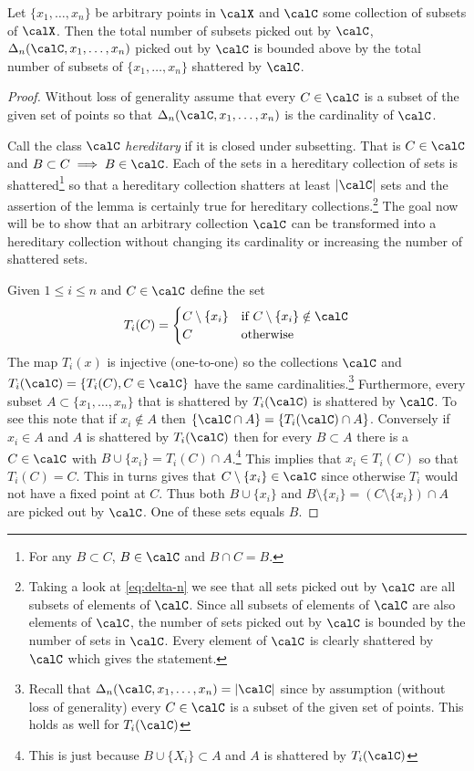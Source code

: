 \begin{lemma}
	\label{lemma:vdv2.6.2}
	Let \(\{x_1,\dots,x_n\}\) be arbitrary points in \(\calX\) and \(\calC\) some collection of subsets of \(\calX\). Then the total number of subsets picked out by \(\calC\), \(\Delta_n(\calC,x_1,\dots,x_n)\) picked out by \(\calC\) is bounded above by the total number of subsets of \(\{x_1,\dots,x_n\}\) shattered by \(\calC\).
\end{lemma}
\begin{proof}
	Without loss of generality assume that every \(C \in\calC\) is a subset of the given set of points so that \(\Delta_n(\calC,x_1,\dots,x_n)\) is the cardinality of \(\calC\).

	Call the class \(\calC\) \textit{hereditary} if it is closed under subsetting. That is \(C\in\calC\) and \(B \subset C\implies B \in\calC\). Each of the sets in a hereditary collection of sets is shattered\footnote{For any \(B \subset C\), \(B \in\calC\) and \(B \cap C = B\).} so that a hereditary collection shatters at least \(|\calC|\) sets and the assertion of the lemma is certainly true for hereditary collections.\footnote{Taking a look at \eqref{eq:delta-n} we see that all sets picked out by \(\calC\) are all subsets of elements of \(\calC\). Since all subsets of elements of \(\calC\) are also elements of \(\calC\), the number of sets picked out by \(\calC\) is bounded by the number of sets in \(\calC\). Every element of \(\calC\) is clearly shattered by \(\calC\) which gives the statement.} The goal now will be to show that an arbitrary collection \(\calC\) can be transformed into a hereditary collection
	without changing its cardinality or increasing the number of shattered sets.

	Given \(1 \leq i \leq n\) and \(C\in\calC\) define the set
	\[
		T_i(C) 
		= \begin{cases}
		C\setminus\{x_i\}  & \text{if } C\setminus\{x_i\}\notin\calC \\
		C &\text{otherwise }
		\end{cases}
	\]
	The map \(T_i(x)\) is injective (one-to-one) so the collections \(\calC\) and \(T_i(\calC) = \{T_i(C), C \in\calC\} \) have the same cardinalities.\footnote{Recall that \(\Delta_n(\calC,x_1,\dots,x_n) = |\calC|\) since by assumption (without loss of generality) every \(C\in\calC\) is a subset of the given set of points. This holds as well for \(T_i(\calC)\)} Furthermore, every subset \(A\subset \{x_1,\dots,x_n\}\) that is shattered by \(T_i(\calC)\) is shattered by \(\calC\). To see this note that if \(x_i\not\in A\) then \(\{\calC\cap A\} = \{T_i(\calC) \cap A\}\). Conversely if \(x_i\in A\) and \(A\) is shattered by \(T_i(\calC)\) then for every \(B\subset A\) there is a \(C\in\calC\) with \(B \cup \{x_i\} = T_i(C)\cap A\).\footnote{This is just because \(B\cup\{X_i\}\subset A\) and \(A\) is shattered by \(T_i(\calC)\)} This implies that \(x_i\in T_i(C)\) so that \(T_i(C)=C\). This in turns gives that \(C\setminus\{x_i\}\in\calC\) since otherwise \(T_i\) would not have a fixed point at \(C\). Thus both \(B\cup\{x_i\}\) and \(B\setminus\{x_i\} = (C\setminus\{x_i\}) \cap A\) are picked out by \(\calC\). One of these sets equals \(B\).
	

\end{proof}
